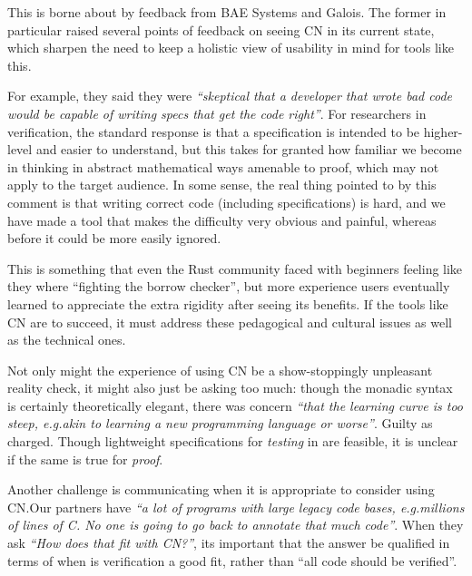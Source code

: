 This is borne about by feedback from BAE Systems and Galois. The former in
particular raised several points of feedback on seeing CN in its current state,
which sharpen the need to keep a holistic view of usability in mind for tools
like this.

For example, they said they were \emph{``skeptical that a developer that wrote
bad code would be capable of writing specs that get the code right''}. For
researchers in verification, the standard response is that a specification is
intended to be higher-level and easier to understand, but this takes for
granted how familiar we become in thinking in abstract mathematical ways
amenable to proof, which may not apply to the target audience. In some sense,
the real thing pointed to by this comment is that writing correct code
(including specifications) is hard, and we have made a tool that makes the
difficulty very obvious and painful, whereas before it could be more easily
ignored.

This is something that even the Rust community faced with beginners feeling
like they where ``fighting the borrow checker'', but more experience users
eventually learned to appreciate the extra rigidity after seeing its benefits.
If the tools like CN are to succeed, it must address these pedagogical and
cultural issues as well as the technical ones.

Not only might the experience of using CN be a show-stoppingly unpleasant
reality check, it might also just be asking too much: though the monadic syntax
is certainly theoretically elegant, there was concern \emph{``that the learning
curve is too steep, e.g.\@ akin to learning a new programming language or
worse''}. Guilty as charged. Though lightweight specifications for
\emph{testing} in  are feasible, it is unclear if the same is true for
\emph{proof}.


Another challenge is communicating when it is appropriate to consider using
CN.\@ Our partners have \emph{``a lot of programs with large legacy code bases,
e.g.\@ millions of lines of C.  No one is going to go back to annotate that
much code''}. When they ask \emph{``How does that fit with CN?''}, its
important that the answer be qualified in terms of when is verification a good
fit, rather than ``all code should be verified''.

